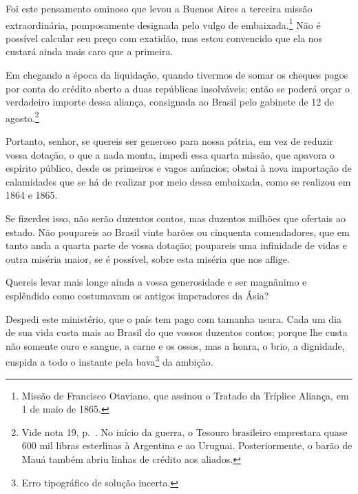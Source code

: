  Foi este pensamento ominoso que levou a Buenos Aires a terceira missão
extraordinária, pomposamente designada pelo vulgo de
embaixada.\footnote{ Missão de Francisco Otaviano, que assinou o Tratado da Tríplice
Aliança, em 1 de maio de 1865.}
 Não é possível calcular seu preço com exatidão, mas estou convencido
que ela nos custará ainda mais caro que a primeira.

 Em chegando a época da liquidação, quando tivermos de somar os cheques
pagos por conta do crédito aberto a duas repúblicas insolváveis; então
se poderá orçar o verdadeiro importe dessa aliança, consignada ao
Brasil pelo gabinete de 12 de
agosto.\footnote{ Vide nota 19, p.~\pageref{gale}. No início da guerra, o Tesouro brasileiro emprestara quase 600
mil libras esterlinas à Argentina e ao Uruguai. Posteriormente, o barão
de Mauá também abriu linhas de crédito aos aliados.}


 Portanto, senhor, se quereis ser generoso para nossa pátria, em vez de
reduzir vossa dotação, o que a nada monta, impedi essa quarta missão,
que apavora o espírito público, desde os primeiros e vagos anúncios;
obstai à nova importação de calamidades que se há de realizar por meio
dessa embaixada, como se realizou em 1864 e 1865. 

 Se fizerdes isso, não serão duzentos contos, mas duzentos milhões que
ofertais ao estado. Não poupareis ao Brasil vinte barões ou cinquenta
comendadores, que em tanto anda a quarta parte de vossa dotação;
poupareis uma infinidade de vidas e outra miséria maior, se é possível,
sobre esta miséria que nos aflige. 

 Quereis levar mais longe ainda a vossa generosidade e ser magnânimo e
esplêndido como costumavam os antigos imperadores da Ásia? 

 Despedi este ministério, que o país tem pago com tamanha usura. Cada um
dia de sua vida custa mais ao Brasil do que vossos duzentos contos;
porque lhe custa não somente ouro e sangue, a carne e os ossos, mas a
honra, o brio, a dignidade, cuspida a todo o instante pela
bava\footnote{ Erro tipográfico de solução incerta.} da ambição. 

